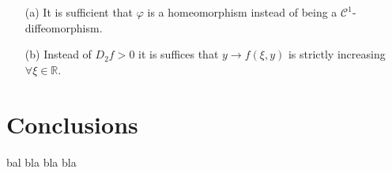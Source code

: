 \documentclass{article}
\begin{document}
\begin{itemize}
	\item[(a)] It is sufficient that $\varphi$ is a homeomorphism instead of being a $\mathcal{C}^{1}$-diffeomorphism.
	\item[(b)] Instead of $D_{2} f > 0$ it is suffices that $y \rightarrow f(\xi, y)$ is strictly increasing $\forall \xi \in \mathbb{R}$.
\end{itemize}



		
\section{Conclusions}
		
\cite{R1}





\newpage		
\begin{thebibliography}{X}
 bal bla bla bla
\end{thebibliography}
		
		
		
		
		
		
		
		
		
		
		
		

	
	
\end{document}
